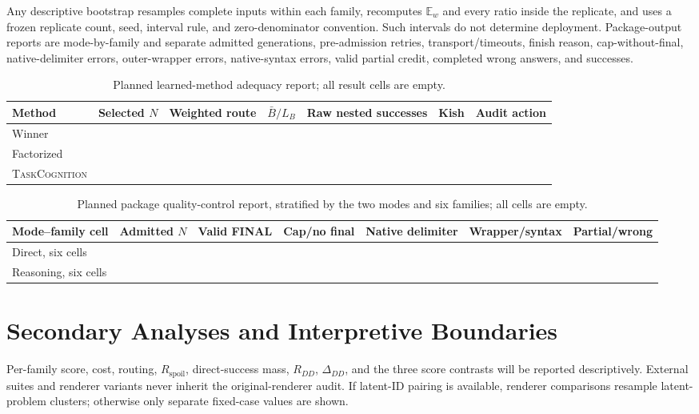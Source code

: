 \documentclass{article}
\newcommand{\TC}{\textsc{TaskCognition}}
\newcommand{\1}{\mathbb{I}}
\newcommand{\Ew}{\mathbb{E}_{w}}
\newcommand{\NA}{\textemdash}
\newcommand{\Rspoil}{R_{\mathrm{spoil}}}
\begin{document}
Any descriptive bootstrap resamples complete inputs within each family, recomputes $\Ew$ and every ratio inside the replicate, and uses a frozen replicate count, seed, interval rule, and zero-denominator convention. Such intervals do not determine deployment. Package-output reports are mode-by-family and separate admitted generations, pre-admission retries, transport/timeouts, finish reason, cap-without-final, native-delimiter errors, outer-wrapper errors, native-syntax errors, valid partial credit, completed wrong answers, and successes.

\begin{table}[t]
\caption{Planned learned-method adequacy report; all result cells are empty.}
\centering\scriptsize
\begin{tabular}{lcccccc}
\toprule
Method & Selected $N$ & Weighted route & $\bar B/L_B$ & Raw nested successes & Kish & Audit action \\
\midrule
Winner & \NA & \NA & \NA & \NA & \NA & \NA \\
Factorized & \NA & \NA & \NA & \NA & \NA & \NA \\
\TC{} & \NA & \NA & \NA & \NA & \NA & \NA \\
\bottomrule
\end{tabular}
\end{table}

\begin{table}[t]
\caption{Planned package quality-control report, stratified by the two modes and six families; all cells are empty.}
\centering\scriptsize
\begin{tabular}{lcccccc}
\toprule
Mode--family cell & Admitted $N$ & Valid FINAL & Cap/no final & Native delimiter & Wrapper/syntax & Partial/wrong \\
\midrule
Direct, six cells & \NA & \NA & \NA & \NA & \NA & \NA \\
Reasoning, six cells & \NA & \NA & \NA & \NA & \NA & \NA \\
\bottomrule
\end{tabular}
\end{table}

\section{Secondary Analyses and Interpretive Boundaries}
Per-family score, cost, routing, $\Rspoil$, direct-success mass, $R_{DD}$, $\Delta_{DD}$, and the three score contrasts will be reported descriptively. External suites and renderer variants never inherit the original-renderer audit. If latent-ID pairing is available, renderer comparisons resample latent-problem clusters; otherwise only separate fixed-case values are shown.
\end{document}
